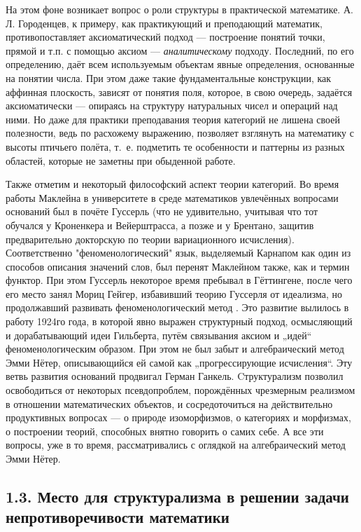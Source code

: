 \documentclass[14pt]{extarticle}
\begin{document}
	На этом фоне возникает вопрос о роли структуры в практической математике. А. Л. Городенцев, к примеру, как практикующий и преподающий математик, противопоставляет аксиоматический подход — построение понятий точки, прямой и т.п. с помощью аксиом — \textit{аналитическому} подходу. Последний, по его определению, даёт всем используемым объектам явные определения, основанные на понятии числа. При этом даже такие фундаментальные конструкции, как аффинная плоскость, зависят от понятия поля, которое, в свою очередь, задаётся аксиоматически — опираясь на структуру натуральных чисел и операций над ними. Но даже для практики преподавания теория категорий не лишена своей полезности, ведь по расхожему выражению, позволяет взглянуть на математику с высоты птичьего полёта, т. е. подметить те особенности и паттерны из разных областей, которые не заметны при обыденной работе.
	
	Также отметим и некоторый философский аспект теории категорий. Во время работы Маклейна в университете в среде математиков увлечённых вопросами оснований был в почёте Гуссерль (что не удивительно, учитывая что тот обучался у Кроненкера и Вейерштрасса, а позже и у Брентано, защитив предварительно докторскую по теории вариационного исчисления). Соответственно "феноменологический" язык, выделяемый Карнапом как один из способов описания значений слов, был перенят Маклейном также, как и термин функтор. При этом Гуссерль некоторое время пребывал в Гёттингене, после чего его место занял Мориц Гейгер, избавивший теорию Гуссерля от идеализма, но продолжавший развивать феноменологический метод  \cite[200]{spiegelberg2012phenomenological}. Это развитие вылилось в работу 1924го года, в которой явно выражен структурный подход, осмысляющий и дорабатывающий идеи Гильберта, путём связывания аксиом и „идей“ феноменологическим образом. При этом не был забыт и алгебраический метод  Эмми Нётер, описывающийся ей самой как „прогрессирующие исчисления“. Эту ветвь развития оснований продвигал Герман Ганкель. 
	Cтруктурализм позволил освободиться от некоторых псевдопроблем, порождённых чрезмерным реализмом в отношении математических объектов, и сосредоточиться на действительно продуктивных вопросах — о природе изоморфизмов, о категориях и морфизмах, о построении теорий, способных внятно говорить о самих себе. А все эти вопросы, уже в то время, рассматривались с оглядкой на алгебраический метод Эмми Нётер.
	
	\subsection*{1.3. Место для структурализма в решении задачи непротиворечивости математики}
	
\end{document}
